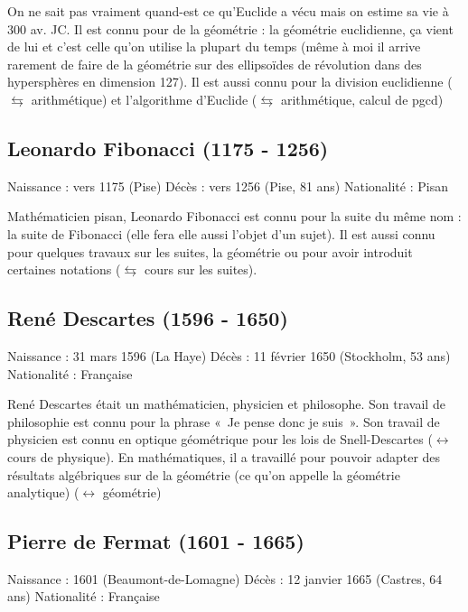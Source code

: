 On ne sait pas vraiment quand-est ce qu'Euclide a vécu mais on estime sa vie à 300 av. JC. 
Il est connu pour de la géométrie : la géométrie euclidienne, ça vient de lui et c'est celle qu'on utilise la plupart du temps (même à moi il arrive rarement de faire de la géométrie sur des ellipsoïdes de révolution dans des hypersphères en dimension 127). Il est aussi connu pour la division euclidienne ($\leftrightarrows$ arithmétique) et l'algorithme d'Euclide ($\leftrightarrows$ arithmétique, calcul de pgcd)

\subsection*{Leonardo Fibonacci (1175 - 1256)}
Naissance : vers 1175 (Pise)\newline
Décès : vers 1256 (Pise, 81 ans)\newline
Nationalité : Pisan\newline


Mathématicien pisan, Leonardo Fibonacci est connu pour la suite du même nom : la suite de Fibonacci (elle fera elle aussi l'objet d'un sujet). Il est aussi connu pour quelques travaux sur les suites, la géométrie ou pour avoir introduit certaines notations ($\leftrightarrows$ cours sur les suites).

\subsection*{René Descartes (1596 - 1650)}
Naissance : 31 mars 1596 (La Haye)\newline
Décès : 11 février 1650 (Stockholm, 53 ans)\newline
Nationalité : Française\newline


René Descartes était un mathématicien, physicien et philosophe. Son travail de philosophie est connu pour la phrase « Je pense donc je suis ». Son travail de physicien est connu en optique géométrique pour les lois de Snell-Descartes ($\leftrightarrow$ cours de physique). En mathématiques, il a travaillé pour pouvoir adapter des résultats algébriques sur de la géométrie (ce qu'on appelle la géométrie analytique) ($\leftrightarrow$  géométrie)


\subsection*{Pierre de Fermat (1601 - 1665)}

Naissance : 1601 (Beaumont-de-Lomagne)\newline
Décès : 12 janvier 1665 (Castres, 64 ans)\newline
Nationalité : Française\newline



